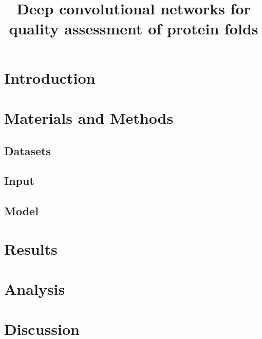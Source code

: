 \documentclass[letter,10pt]{article}
\title{Deep convolutional networks for quality assessment of protein folds}
\author{}
\begin{document}
\maketitle

\begin{abstract}

\end{abstract}

\section{Introduction}


\section{Materials and Methods}

\subsection{Datasets}


\subsection{Input}


\subsection{Model}




\section{Results}


\section{Analysis}


\section{Discussion}


{}

\end{document}
